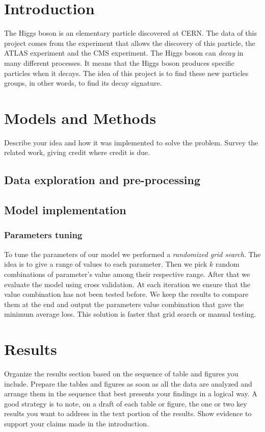 \documentclass[10pt,conference,compsocconf]{IEEEtran}
\begin{document}
\section{Introduction}\label{sec: introduction}
    The Higgs boson is an elementary particle discovered at CERN. The data of this project comes from the experiment that allows the discovery of this particle, the ATLAS experiment and the CMS experiment. The Higgs boson can \textit{decay} in many different processes. It means that the Higgs boson produces specific particles when it decays. The idea of this project is to find these new particles groups, in other words,  to find its decay signature.
\section{Models and Methods}\label{sec: models_methods}
    Describe your idea and how it was implemented to solve
    the problem. Survey the related work, giving credit where credit is
    due.
    \subsection{Data exploration and pre-processing}\label{subsec:data_cleaning}
    \subsection{Model implementation}
        \subsubsection{Parameters tuning}
            To tune the parameters of our model we performed a \textit{randomized grid search}. The idea is to give a range of values to each parameter. Then we pick $k$ random combinations of parameter's value among their respective range. After that we evaluate the model using cross validation. At each iteration we ensure that the value combination has not been tested before. We keep the results to compare them at the end and output the parameters value combination that gave the minimum average loss. This solution is faster that grid search or manual testing.
\section{Results}\label{sec: results}
    Organize the results section based on the sequence of table and
    figures you include. Prepare the tables and figures as soon as all
    the data are analyzed and arrange them in the sequence that best
    presents your findings in a logical way. A good strategy is to note,
    on a draft of each table or figure, the one or two key results you
    want to address in the text portion of the results.
    Show evidence to support your claims made in the
    introduction.
\end{document}
